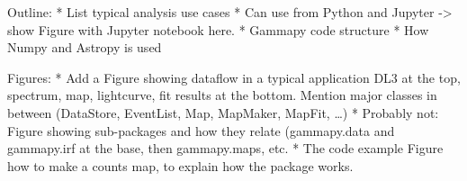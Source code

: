 Outline: * List typical analysis use cases * Can use from Python and Jupyter ->
show Figure with Jupyter notebook here. * Gammapy code structure * How Numpy
and Astropy is used

Figures: * Add a Figure showing dataflow in a typical application DL3 at the
top, spectrum, map, lightcurve, fit results at the bottom. Mention major
classes in between (DataStore, EventList, Map, MapMaker, MapFit, …) * Probably
not: Figure showing sub-packages and how they relate (gammapy.data and
gammapy.irf at the base, then gammapy.maps, etc. * The code example Figure how
to make a counts map, to explain how the package works.














